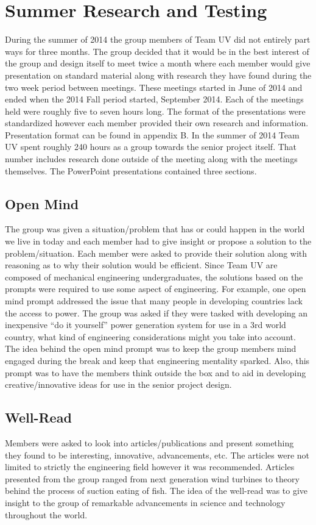 \documentclass{report}
\begin{document}
\chapter{Summer Research and Testing}
During the summer of 2014 the group members of Team UV did not entirely part ways for three months. The group decided that it would be in the best interest of the group and design itself to meet twice a month where each member would give presentation on standard material along with research they have found during the two week period between meetings. These meetings started in June of 2014 and ended when the 2014 Fall period started, September 2014.  Each of the meetings held were roughly five to seven hours long. The format of the presentations were standardized however each member provided their own research and information. Presentation format can be found in appendix B. In the summer of 2014 Team UV spent roughly 240 hours as a group towards the senior project itself. That number includes research done outside of the meeting along with the meetings themselves. The PowerPoint presentations contained three sections.
\section{Open Mind}
The group was given a situation/problem that has or could happen in the world we live in today and each member had to give insight or propose a solution to the problem/situation. Each member were asked to provide their solution along with reasoning  as to why their solution would be efficient. Since Team UV are composed of mechanical engineering undergraduates, the solutions based on the prompts were required to use some aspect of engineering. For example, one open mind prompt addressed the issue that many people in developing countries lack the access to power. The group was asked if they were tasked with developing an inexpensive “do it yourself” power generation system for use in a 3rd world country, what kind of engineering considerations might you take into account. The idea behind the open mind prompt was to keep the group members mind engaged during the break and keep that engineering mentality sparked. Also, this prompt was to have the members think outside the box and to aid in developing creative/innovative ideas for use in the senior project design.
\section{Well-Read}
Members were asked to look into articles/publications and present something they found to be interesting, innovative, advancements, etc. The articles were not limited to strictly the engineering field however it was recommended.  Articles presented from the group ranged from next generation wind turbines to theory behind the process of suction eating of fish. The idea of the well-read was to give insight to the group of remarkable advancements in science and technology throughout the world.
\end{document}
